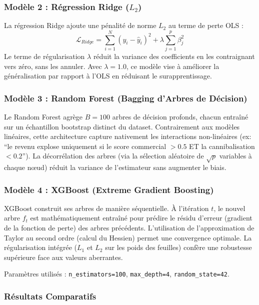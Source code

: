 \subsubsection{Modèle 2 : Régression Ridge ($L_2$)}

La régression Ridge ajoute une pénalité de norme $L_2$ au terme de perte OLS :
\begin{equation}
\mathcal{L}_{Ridge} = \sum_{i=1}^{N} (y_i - \hat{y}_i)^2 + \lambda \sum_{j=1}^{p} \beta_j^2
\end{equation}
Le terme de régularisation $\lambda$ réduit la variance des coefficients en les contraignant vers zéro, sans les annuler. Avec $\lambda = 1.0$, ce modèle vise à améliorer la généralisation par rapport à l'OLS en réduisant le surapprentissage.

\subsubsection{Modèle 3 : Random Forest (Bagging d'Arbres de Décision)}

Le Random Forest agrège $B = 100$ arbres de décision profonds, chacun entraîné sur un échantillon bootstrap distinct du dataset. Contrairement aux modèles linéaires, cette architecture capture nativement les interactions non-linéaires (ex: ``le revenu explose uniquement si le score commercial $> 0.5$ ET la cannibalisation $< 0.2$''). La décorrélation des arbres (via la sélection aléatoire de $\sqrt{p}$ variables à chaque nœud) réduit la variance de l'estimateur sans augmenter le biais.

\subsubsection{Modèle 4 : XGBoost (Extreme Gradient Boosting)}

XGBoost construit ses arbres de manière séquentielle. À l'itération $t$, le nouvel arbre $f_t$ est mathématiquement entraîné pour prédire le résidu d'erreur (gradient de la fonction de perte) des arbres précédents. L'utilisation de l'approximation de Taylor au second ordre (calcul du Hessien) permet une convergence optimale. La régularisation intégrée ($L_1$ et $L_2$ sur les poids des feuilles) confère une robustesse supérieure face aux valeurs aberrantes.

Paramètres utilisés : \texttt{n\_estimators=100}, \texttt{max\_depth=4}, \texttt{random\_state=42}.

\subsubsection{Résultats Comparatifs}

